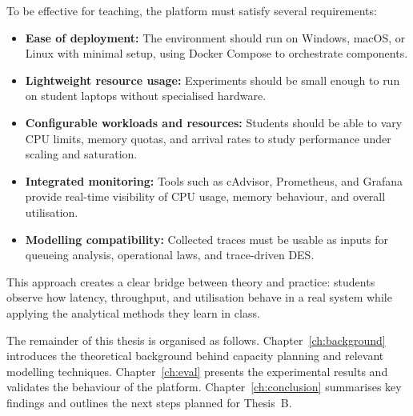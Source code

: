 To be effective for teaching, the platform must satisfy several
requirements:

\begin{itemize}
    \item \textbf{Ease of deployment:} The environment should run on
          Windows, macOS, or Linux with minimal setup, using Docker
          Compose to orchestrate components.
    \item \textbf{Lightweight resource usage:} Experiments should be small
          enough to run on student laptops without specialised hardware.
    \item \textbf{Configurable workloads and resources:} Students should be
          able to vary CPU limits, memory quotas, and arrival rates to
          study performance under scaling and saturation.
    \item \textbf{Integrated monitoring:} Tools such as cAdvisor,
          Prometheus, and Grafana provide real-time visibility of CPU
          usage, memory behaviour, and overall utilisation.
    \item \textbf{Modelling compatibility:} Collected traces must be usable
          as inputs for queueing analysis, operational laws, and
          trace-driven DES.
\end{itemize}

This approach creates a clear bridge between theory and practice:
students observe how latency, throughput, and utilisation behave in a
real system while applying the analytical methods they learn in class.

\bigskip

The remainder of this thesis is organised as follows.  
Chapter~\ref{ch:background} introduces the theoretical background behind
capacity planning and relevant modelling techniques.  
Chapter~\ref{ch:eval} presents the experimental results and validates the
behaviour of the platform.  
Chapter~\ref{ch:conclusion} summarises key findings and outlines the next
steps planned for Thesis~B.

